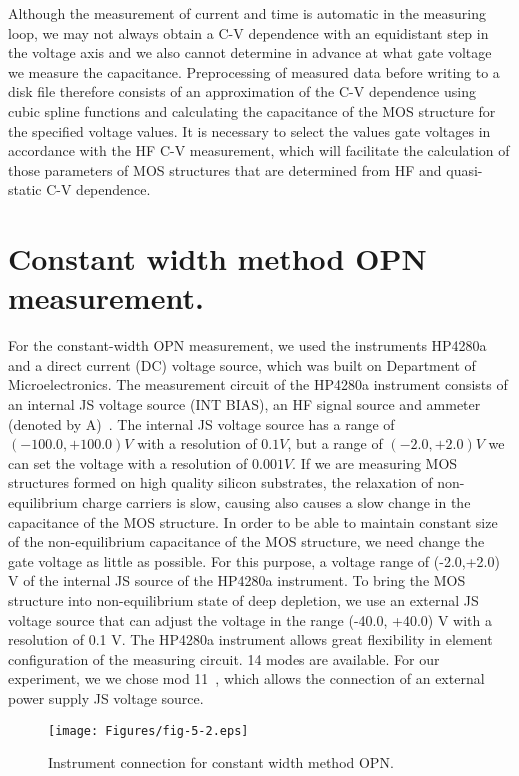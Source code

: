 Although the measurement of current and time is automatic in the
measuring loop, we may not always obtain a C-V dependence with an
equidistant step in the voltage axis and we also cannot determine in
advance at what gate voltage we measure the capacitance.
Preprocessing of measured data before writing to a disk file therefore
consists of an approximation of the C-V dependence using cubic spline
functions and calculating the capacitance of the MOS structure for the
specified voltage values. It is necessary to select the values gate
voltages in accordance with the HF C-V measurement, which will
facilitate the calculation of those parameters of MOS structures that
are determined from HF and quasi-static C-V dependence.

\section{Constant width method OPN measurement.}\label{sec:5.3}

For the constant-width OPN measurement, we used the instruments
HP4280a and a direct current (DC) voltage source, which was built on
Department of Microelectronics. The measurement circuit of the HP4280a
instrument consists of an internal JS voltage source (INT BIAS), an HF
signal source and ammeter (denoted by A)~\cite{5.7}. The internal JS
voltage source has a range of $(-100.0,+100.0)V$ with a resolution of
$0.1V$, but a range of $(-2.0,+2.0)V$ we can set the voltage with a
resolution of $0.001V$. If we are measuring MOS structures formed on
high quality silicon substrates, the relaxation of non-equilibrium
charge carriers is slow, causing also causes a slow change in the
capacitance of the MOS structure.  In order to be able to maintain
constant size of the non-equilibrium capacitance of the MOS structure,
we need change the gate voltage as little as possible. For this
purpose, a voltage range of (-2.0,+2.0) V of the internal JS source of
the HP4280a instrument. To bring the MOS structure into
non-equilibrium state of deep depletion, we use an external JS voltage
source that can adjust the voltage in the range (-40.0, +40.0) V with
a resolution of 0.1 V. The HP4280a instrument allows great flexibility
in element configuration of the measuring circuit. 14 modes are
available. For our experiment, we we chose mod 11~\cite{5.2}, which
allows the connection of an external power supply JS voltage source.

\begin{figure}[h!]\centering
  \texttt{[image: Figures/fig-5-2.eps]}
  \caption[Instrument wiring for constant width method
    OPN]{Instrument connection for constant width method
    OPN.}\label{fig:5.2}
\end{figure}


